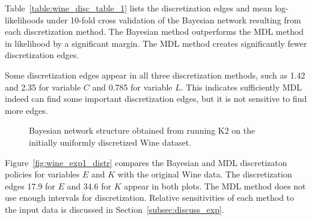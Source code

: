 Table~\ref{table:wine_disc_table_1} lists the discretization edges and mean log-likelihoods under \num{10}-fold cross validation of the Bayesian network resulting from each discretization method.
The Bayesian method outperforms the MDL method in likelihood by a significant margin.
The MDL method creates significantly fewer discretization edges.

Some discretization edges appear in all three discretization methods, such as \num{1.42} and \num{2.35} for variable $C$ and \num{0.785} for variable $L$.
This indicates sufficiently MDL indeed can find some important discretization edges, but it is not sensitive to find more edges.

\begin{figure}[ht]
  \centering
  \scalebox{0.8}{}
  \caption{Bayesian network structure obtained from running K2 on the initially uniformly discretized Wine dataset.}
  \label{fig:wine_graph_1}
\end{figure}

\begin{table}
  \centering
  \caption{
    Results from discretization of the Wine MPG dataset with fixed structure.
    Bold discretization edges were identified by both methods.
  }
  \scalebox{1.0}{
  
  }
  \label{table:wine_disc_table_1}
\end{table}

Figure~\ref{fig:wine_exp1_distr} compares the Bayesian and MDL discretizaton policies for variables $E$ and $K$ with the original Wine data.
The discretization edges \num{17.9} for $E$ and \num{34.6} for $K$ appear in both plots.
The MDL method does not use enough intervals for discretization.
Relative sensitivities of each method to the input data is discussed in Section~\ref{subsec:discuss_exp}.

